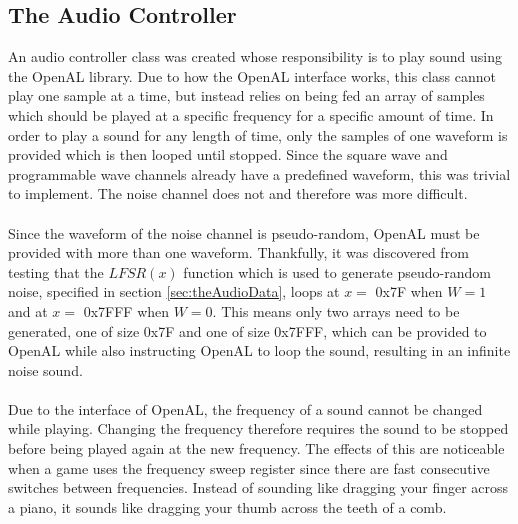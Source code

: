 \subsection{The Audio Controller}
An audio controller class was created whose responsibility is to play sound using the OpenAL library. Due to how the OpenAL interface works, this class cannot play one sample at a time, but instead relies on being fed an array of samples which should be played at a specific frequency for a specific amount of time. In order to play a sound for any length of time, only the samples of one waveform is provided which is then looped until stopped. Since the square wave and programmable wave channels already have a predefined waveform, this was trivial to implement. The noise channel does not and therefore was more difficult.
\\\\
Since the waveform of the noise channel is pseudo-random, OpenAL must be provided with more than one waveform. Thankfully, it was discovered from testing that the $LFSR(x)$ function which is used to generate pseudo-random noise, specified in section \ref{sec:theAudioData}, loops at $x = $ 0x7F when $W = 1$ and at $x = $ 0x7FFF when $W = 0$. This means only two arrays need to be generated, one of size 0x7F and one of size 0x7FFF, which can be provided to OpenAL while also instructing OpenAL to loop the sound, resulting in an infinite noise sound.
\\\\
Due to the interface of OpenAL, the frequency of a sound cannot be changed while playing. Changing the frequency therefore requires the sound to be stopped before being played again at the new frequency. The effects of this are noticeable when a game uses the frequency sweep register since there are fast consecutive switches between frequencies. Instead of sounding like dragging your finger across a piano, it sounds like dragging your thumb across the teeth of a comb.

